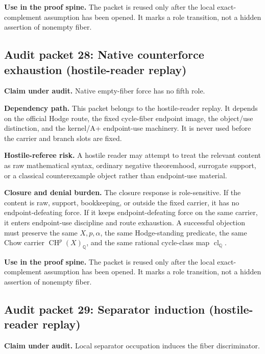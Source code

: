 \documentclass[11pt]{article}
\newcommand{\QQ}{\mathbb{Q}}
\newcommand{\CH}{\operatorname{CH}}
\newcommand{\clQ}{\operatorname{cl}_{\QQ}}
\begin{document}
\par\noindent\textbf{Use in the proof spine.} The packet is reused only after the local exact-complement assumption has been opened. It marks a role transition, not a hidden assertion of nonempty fiber.


\subsection{Audit packet 28: Native counterforce exhaustion (hostile-reader replay)}


\par\noindent\textbf{Claim under audit.} Native empty-fiber force has no fifth role.


\par\noindent\textbf{Dependency path.} This packet belongs to the hostile-reader replay. It depends on the official Hodge route, the fixed cycle-fiber endpoint image, the object/use distinction, and the kernel/A+ endpoint-use machinery. It is never used before the carrier and branch slots are fixed.


\par\noindent\textbf{Hostile-referee risk.} A hostile reader may attempt to treat the relevant content as raw mathematical syntax, ordinary negative theoremhood, surrogate support, or a classical counterexample object rather than endpoint-use material.


\par\noindent\textbf{Closure and denial burden.} The closure response is role-sensitive. If the content is raw, support, bookkeeping, or outside the fixed carrier, it has no endpoint-defeating force. If it keeps endpoint-defeating force on the same carrier, it enters endpoint-use discipline and route exhaustion. A successful objection must preserve the same $X,p,\alpha$, the same Hodge-standing predicate, the same Chow carrier $\CH^p(X)_\QQ$, and the same rational cycle-class map $\clQ$.


\par\noindent\textbf{Use in the proof spine.} The packet is reused only after the local exact-complement assumption has been opened. It marks a role transition, not a hidden assertion of nonempty fiber.


\subsection{Audit packet 29: Separator induction (hostile-reader replay)}


\par\noindent\textbf{Claim under audit.} Local separator occupation induces the fiber discriminator.
\end{document}

